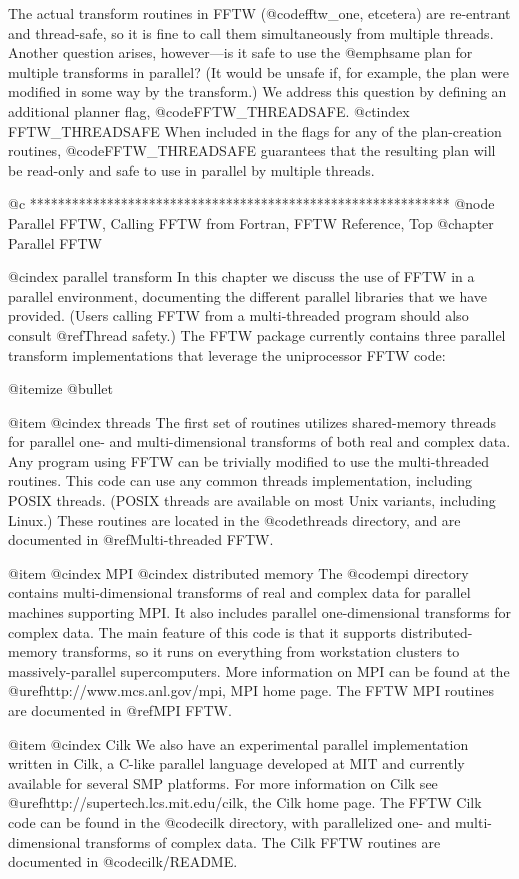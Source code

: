 The actual transform routines in FFTW (@code{fftw_one}, etcetera) are
re-entrant and thread-safe, so it is fine to call them simultaneously
from multiple threads.  Another question arises, however---is it safe to
use the @emph{same plan} for multiple transforms in parallel?  (It would
be unsafe if, for example, the plan were modified in some way by the
transform.)  We address this question by defining an additional planner
flag, @code{FFTW_THREADSAFE}.
@ctindex FFTW_THREADSAFE
When included in the flags for any of the plan-creation routines,
@code{FFTW_THREADSAFE} guarantees that the resulting plan will be
read-only and safe to use in parallel by multiple threads.

@c ************************************************************
@node Parallel FFTW, Calling FFTW from Fortran, FFTW Reference, Top
@chapter Parallel FFTW

@cindex parallel transform
In this chapter we discuss the use of FFTW in a parallel environment,
documenting the different parallel libraries that we have provided.
(Users calling FFTW from a multi-threaded program should also consult
@ref{Thread safety}.)  The FFTW package currently contains three parallel
transform implementations that leverage the uniprocessor FFTW code:

@itemize @bullet

@item
@cindex threads
The first set of routines utilizes shared-memory threads for parallel
one- and multi-dimensional transforms of both real and complex data.
Any program using FFTW can be trivially modified to use the
multi-threaded routines.  This code can use any common threads
implementation, including POSIX threads.  (POSIX threads are available
on most Unix variants, including Linux.)  These routines are located in
the @code{threads} directory, and are documented in @ref{Multi-threaded
FFTW}.

@item
@cindex MPI
@cindex distributed memory
The @code{mpi} directory contains multi-dimensional transforms
of real and complex data for parallel machines supporting MPI.  It also
includes parallel one-dimensional transforms for complex data.  The main
feature of this code is that it supports distributed-memory transforms,
so it runs on everything from workstation clusters to massively-parallel
supercomputers.  More information on MPI can be found at the
@uref{http://www.mcs.anl.gov/mpi, MPI home page}.  The FFTW MPI routines
are documented in @ref{MPI FFTW}.

@item
@cindex Cilk
We also have an experimental parallel implementation written in Cilk, a
C-like parallel language developed at MIT and currently available for
several SMP platforms.  For more information on Cilk see
@uref{http://supertech.lcs.mit.edu/cilk, the Cilk home page}.  The FFTW
Cilk code can be found in the @code{cilk} directory, with parallelized
one- and multi-dimensional transforms of complex data.  The Cilk FFTW
routines are documented in @code{cilk/README}.

